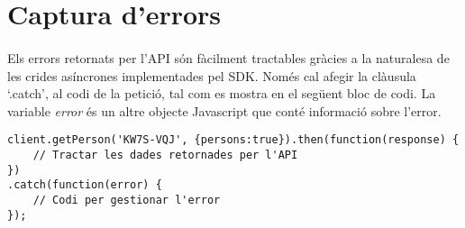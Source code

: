 \section{Captura d'errors}

    \paragraph{}
    Els errors retornats per l'API són fàcilment tractables gràcies a la naturalesa de les crides asíncrones implementades pel SDK. Només cal afegir la clàusula `.catch', al codi de la petició, tal com es mostra en el següent bloc de codi. La variable \emph{error} és un altre objecte Javascript que conté informació sobre l’error.

\begin{lstlisting}[style=rawOwn,caption={Tractament d'errors amb l'objecte \emph{error}}]
client.getPerson('KW7S-VQJ', {persons:true}).then(function(response) {
    // Tractar les dades retornades per l'API
})
.catch(function(error) {
    // Codi per gestionar l'error
});

\end{lstlisting}
